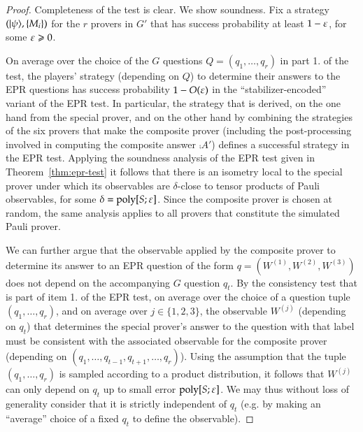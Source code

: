 \begin{proof}
Completeness of the test is clear. We show soundness. 
Fix a strategy $(|\psi\rangle,\{M_i\})$ for the $r$ provers in $G'$ that has success probability at least $1-\varepsilon$, for some $\varepsilon\geqslant 0$. 

On average over the choice of the $G$ questions $Q=(q_1,\ldots,q_r)$ in part 1. of the test, the players' strategy (depending on $Q$) to determine their answers to the EPR questions has success probability $1-O(\varepsilon)$ in the ``stabilizer-encoded'' variant of the EPR test. In particular, the strategy that is derived, on the one hand from the special prover, and on the other hand by combining the strategies of the six provers that make the composite prover (including the post-processing involved in computing the composite answer $\comp{A'}$) defines a successful strategy in the EPR test. Applying the soundness analysis of the EPR test given in Theorem~\ref{thm:epr-test} it follows that there is an isometry local to the special prover under which its observables are $\delta$-close to tensor products of Pauli observables, for some $\delta = \operatorname{poly}[S;\varepsilon]$. Since the composite prover is chosen at random, the same analysis applies to all provers that constitute the simulated Pauli prover. 

We can further argue that the observable applied by the composite prover to determine its answer to an EPR question of the form $q=(W^{(1)},W^{(2)},W^{(3)})$ does not depend on the accompanying $G$ question $q_t$. By the consistency test that is part of item 1. of the EPR test, on average over the choice of a question tuple $(q_1,\ldots,q_r)$, and on average over $j\in\{1,2,3\}$, the observable $W^{(j)}$ (depending on $q_t$) that determines the special prover's answer to the question with that label must be consistent with the associated observable for the composite prover (depending on $(q_1,\ldots,q_{t-1},q_{t+1},\ldots,q_r)$). Using the assumption that the tuple $(q_1,\ldots,q_r)$ is sampled according to a product distribution, it follows that $W^{(j)}$ can only depend on $q_t$ up to small error $\operatorname{poly}[S;\varepsilon]$. We may thus without loss of generality consider that it is strictly independent of $q_t$ (e.g. by making an ``average'' choice of a fixed $q_t$ to define the observable). 


\end{proof}
